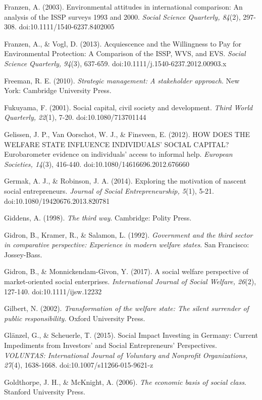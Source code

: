 \documentclass{article}
\begin{document}
Franzen, A. (2003). Environmental attitudes in international comparison: An analysis of the ISSP surveys 1993 and 2000. \emph{Social Science Quarterly, 84}(2), 297-308. doi:10.1111/1540-6237.8402005

Franzen, A., \& Vogl, D. (2013). Acquiescence and the Willingness to Pay for Environmental Protection: A Comparison of the ISSP, WVS, and EVS. \emph{Social Science Quarterly, 94}(3), 637-659. doi:10.1111/j.1540-6237.2012.00903.x

Freeman, R. E. (2010). \emph{Strategic management: A stakeholder approach}. New York: Cambridge University Press.

Fukuyama, F. (2001). Social capital, civil society and development. \emph{Third World Quarterly, 22}(1), 7-20. doi:10.1080/713701144

Gelissen, J. P., Van Oorschot, W. J., \& Finsveen, E. (2012). HOW DOES THE WELFARE STATE INFLUENCE INDIVIDUALS' SOCIAL CAPITAL? Eurobarometer evidence on individuals' access to informal help. \emph{European Societies, 14}(3), 416-440. doi:10.1080/14616696.2012.676660

Germak, A. J., \& Robinson, J. A. (2014). Exploring the motivation of nascent social entrepreneurs. \emph{Journal of Social Entrepreneurship, 5}(1), 5-21. doi:10.1080/19420676.2013.820781

Giddens, A. (1998). \emph{The third way}. Cambridge: Polity Press.

Gidron, B., Kramer, R., \& Salamon, L. (1992). \emph{Government and the third sector in comparative perspective: Experience in modern welfare states}. San Francisco: Jossey-Bass.

Gidron, B., \& Monnickendam-Givon, Y. (2017). A social welfare perspective of market-oriented social enterprises. \emph{International Journal of Social Welfare, 26}(2), 127-140. doi:10.1111/ijsw.12232

Gilbert, N. (2002). \emph{Transformation of the welfare state: The silent surrender of public responsibility.} Oxford University Press.

Glänzel, G., \& Scheuerle, T. (2015). Social Impact Investing in Germany: Current Impediments from Investors' and Social Entrepreneurs' Perspectives. \emph{VOLUNTAS: International Journal of Voluntary and }\emph{Nonprofit}\emph{ Organizations, 27}(4), 1638-1668. doi:10.1007/s11266-015-9621-z

Goldthorpe, J. H., \& McKnight, A. (2006). \emph{The economic basis of social class}. Stanford University Press.
\end{document}
